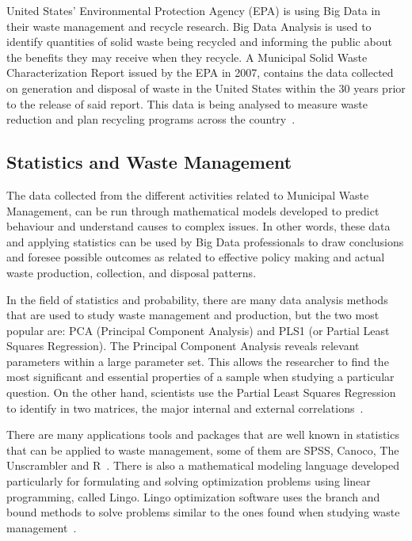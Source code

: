United States' Environmental Protection Agency (EPA) is using Big Data in 
their waste management and recycle research. Big Data Analysis is used to 
identify quantities of solid waste being recycled and informing the public 
about the benefits they may receive when they recycle. A Municipal Solid 
Waste Characterization Report issued by the EPA in 2007, contains the data 
collected on generation and disposal of waste in the United States within 
the 30 years prior to the release of said report. This data is being 
analysed to measure waste reduction and plan recycling programs across the 
country~\cite{epaRecycleBenefits2007}.

\subsection{Statistics and Waste Management}

The data collected from the different activities related to Municipal Waste 
Management, can be run through mathematical models developed to predict 
behaviour and understand causes to complex issues. In other words, these 
data and applying statistics can be used by Big Data professionals to draw 
conclusions and foresee possible outcomes as related to effective policy 
making and actual waste production, collection, and disposal patterns. 

In the field of statistics and probability, there are many data analysis 
methods that are used to  study waste management and production, but the 
two most popular are: PCA (Principal Component Analysis) and PLS1
 (or Partial Least Squares Regression). The Principal Component Analysis  
reveals relevant parameters within a large parameter set. This allows the 
researcher to find the most significant and essential properties of a sample 
when studying a particular question. On the other hand, scientists use the 
Partial Least Squares Regression to identify in two matrices, the major 
internal and external correlations~\cite{bohm2013}.

There are many applications tools and packages that are well known in 
statistics that can be applied to waste management, some of them are 
SPSS, Canoco, The Unscrambler and R~\cite{bohm2013}.
There is also  a mathematical modeling language developed  particularly 
for formulating and solving  optimization problems using linear programming, 
called Lingo. Lingo optimization software uses the branch and bound methods 
to solve problems similar to the ones found when studying waste 
management~\cite{akbarpour2016}.

